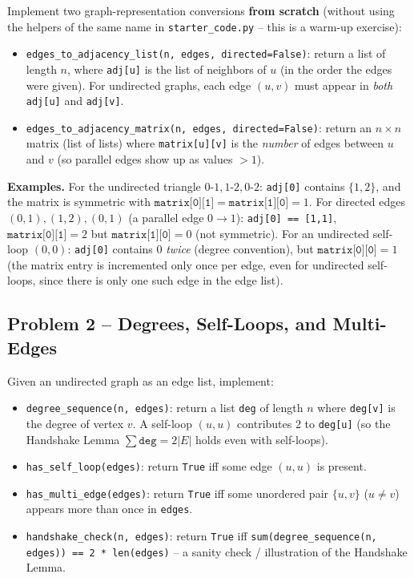 \documentclass[11pt]{article}
\begin{document}
Implement two graph-representation conversions \textbf{from scratch} (without using the
helpers of the same name in \texttt{starter\_code.py} -- this is a warm-up exercise):

\begin{itemize}
    \item \texttt{edges\_to\_adjacency\_list(n, edges, directed=False)}: return a list of
    length $n$, where \texttt{adj[u]} is the list of neighbors of $u$ (in the order the
    edges were given). For undirected graphs, each edge $(u,v)$ must appear in
    \emph{both} \texttt{adj[u]} and \texttt{adj[v]}.
    \item \texttt{edges\_to\_adjacency\_matrix(n, edges, directed=False)}: return an $n
    \times n$ matrix (list of lists) where \texttt{matrix[u][v]} is the \emph{number} of
    edges between $u$ and $v$ (so parallel edges show up as values $> 1$).
\end{itemize}

\textbf{Examples.} For the undirected triangle $0\text{-}1, 1\text{-}2, 0\text{-}2$:
\texttt{adj[0]} contains $\{1,2\}$, and the matrix is symmetric with
$\texttt{matrix[0][1]}=\texttt{matrix[1][0]}=1$. For directed edges
$(0,1),(1,2),(0,1)$ (a parallel edge $0\to1$): \texttt{adj[0] == [1,1]},
$\texttt{matrix[0][1]}=2$ but $\texttt{matrix[1][0]}=0$ (not symmetric). For an
undirected self-loop $(0,0)$: \texttt{adj[0]} contains $0$ \emph{twice} (degree
convention), but $\texttt{matrix[0][0]}=1$ (the matrix entry is incremented only once per
edge, even for undirected self-loops, since there is only one such edge in the edge
list).

\subsection*{Problem 2 -- Degrees, Self-Loops, and Multi-Edges}

Given an undirected graph as an edge list, implement:

\begin{itemize}
    \item \texttt{degree\_sequence(n, edges)}: return a list \texttt{deg} of length $n$
    where \texttt{deg[v]} is the degree of vertex $v$. A self-loop $(u,u)$ contributes 2
    to \texttt{deg[u]} (so the Handshake Lemma $\sum \texttt{deg} = 2|E|$ holds even with
    self-loops).
    \item \texttt{has\_self\_loop(edges)}: return \texttt{True} iff some edge $(u,u)$ is
    present.
    \item \texttt{has\_multi\_edge(edges)}: return \texttt{True} iff some unordered pair
    $\{u,v\}$ ($u \ne v$) appears more than once in \texttt{edges}.
    \item \texttt{handshake\_check(n, edges)}: return \texttt{True} iff
    \texttt{sum(degree\_sequence(n, edges)) == 2 * len(edges)} -- a sanity check /
    illustration of the Handshake Lemma.
\end{itemize}
\end{document}
